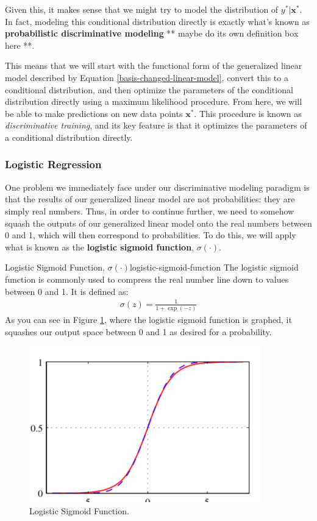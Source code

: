Given this, it makes sense that we might try to model the distribution of $y^{*}|\textbf{x}^{*}$. In fact, modeling this conditional distribution directly is exactly what's known as \textbf{probabilistic discriminative modeling} ** maybe do its own definition box here **.

This means that we will start with the functional form of the generalized linear model described by Equation \ref{basis-changed-linear-model}, convert this to a conditional distribution, and then optimize the parameters of the conditional distribution directly using a maximum likelihood procedure. From here, we will be able to make predictions on new data points $\textbf{x}^{*}$. This procedure is known as \textit{discriminative training}, and its key feature is that it optimizes the parameters of a conditional distribution directly.

\subsubsection{Logistic Regression}
One problem we immediately face under our discriminative modeling paradigm is that the results of our generalized linear model are not probabilities: they are simply real numbers. Thus, in order to continue further, we need to somehow squash the outputs of our generalized linear model onto the real numbers between 0 and 1, which will then correspond to probabilities. To do this, we will apply what is known as the \textbf{logistic sigmoid function}, $\sigma(\cdot)$.

\begin{definition}{Logistic Sigmoid Function, $\sigma(\cdot)$}{logistic-sigmoid-function}
	The logistic sigmoid function is commonly used to compress the real number line down to values between 0 and 1. It is defined as:
	\begin{align*}
		\sigma(z) = \frac{1}{1 + \exp{(-z)}}
	\end{align*}
	As you can see in Figure \ref{fig:log-sig-fn}, where the logistic sigmoid function is graphed, it squashes our output space between 0 and 1 as desired for a probability.
\end{definition}

\begin{figure}
    \centering
    \includegraphics[width=0.5\paperwidth]{../Classification/fig/log_sig_fn.png}
    \caption{Logistic Sigmoid Function.}
    \label{fig:log-sig-fn}
\end{figure}

